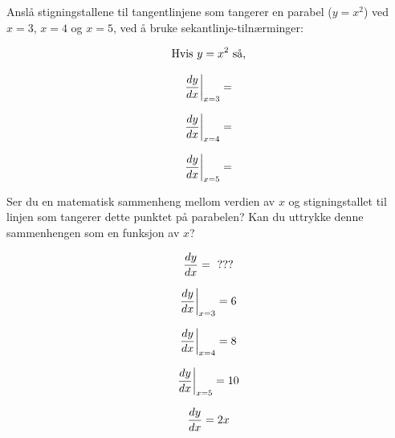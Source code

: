 

Anslå stigningstallene til tangentlinjene som tangerer en parabel ($y = x^2$) ved $x=3$, $x=4$ og $x=5$, ved å bruke sekantlinje-tilnærminger:

\vskip 10pt

$$\hbox{Hvis } y = x^2 \hbox{ så,}$$

\vskip 20pt

$${{dy \over dx} \bigg|} _ {x=3} = $$

\vskip 20pt

$${{dy \over dx} \bigg|} _ {x=4} = $$

\vskip 20pt

$${{dy \over dx} \bigg|} _ {x=5} = $$

\vskip 20pt

Ser du en matematisk sammenheng mellom verdien av $x$ og stigningstallet til linjen som tangerer dette punktet på parabelen? Kan du uttrykke denne sammenhengen som en funksjon av $x$?

$${dy \over dx} = \hbox{ ???}$$







$${{dy \over dx} \bigg|} _ {x=3} = 6$$

\vskip 20pt

$${{dy \over dx} \bigg|} _ {x=4} = 8$$

\vskip 20pt

$${{dy \over dx} \bigg|} _ {x=5} = 10$$

\vskip 20pt

$${dy \over dx} = 2x$$












